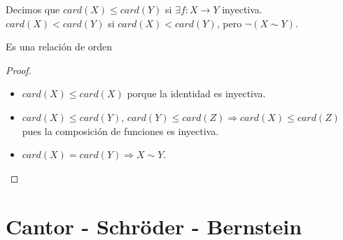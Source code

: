 \begin{definition}
    Decimos que \(card(X) \leq card(Y)\) si \(\exists f: X \to Y\) inyectiva. \\
    \(card(X) < card(Y)\) si \(card(X) < card(Y)\), pero \(\neg(X\sim Y)\).
\end{definition}

\begin{prop}
    Es una relación de orden
    \begin{proof}
        \begin{itemize}
            \item \(card(X) \leq card(X)\) porque la identidad es inyectiva.
            \item \(card(X) \leq card(Y)\), \(card(Y) \leq card(Z) \Rightarrow card(X) \leq card(Z)\) pues la composición de funciones es inyectiva.
            \item \(card(X) = card(Y) \Rightarrow X \sim Y\).
        \end{itemize}
    \end{proof}
\end{prop}

\section{Cantor - Schröder - Bernstein}

